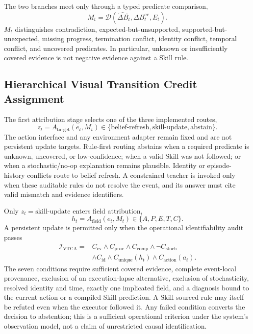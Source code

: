The two branches meet only through a typed predicate comparison,
\begin{equation}
    M_t=\mathcal{D}\left(\widehat{\Delta B}_t,
    \Delta B_t^{\mathrm{ev}},E_t\right).
\end{equation}
$M_t$ distinguishes contradiction, expected-but-unsupported, supported-but-unexpected, missing progress, termination conflict, identity conflict, temporal conflict, and uncovered predicates. In particular, unknown or insufficiently covered evidence is not negative evidence against a Skill rule.

\subsection{Hierarchical Visual Transition Credit Assignment}

The first attribution stage selects one of the three implemented routes,
{\color{red}
\begin{equation}
    z_t=A_{\mathrm{target}}(e_t,M_t)
    \in\{\mathrm{belief\mbox{-}refresh},
    \mathrm{skill\mbox{-}update},\mathrm{abstain}\}.
\end{equation}
The action interface and any environment adapter remain fixed and are not persistent update targets.}
Rule-first routing abstains when a required predicate is unknown, uncovered, or low-confidence; when a valid Skill was not followed; or when a stochastic/no-op explanation remains plausible. Identity or episode-history conflicts route to belief refresh.  A constrained teacher is invoked only when these auditable rules do not resolve the event, and its answer must cite valid mismatch and evidence identifiers.

Only $z_t=\mathrm{skill\mbox{-}update}$ enters field attribution,
\begin{equation}
    h_t=A_{\mathrm{field}}(e_t,M_t)
    \in\{A,P,E,T,C\}.
\end{equation}
{\color{red}A persistent update is permitted only when the operational identifiability audit passes
\begin{equation}
    \begin{aligned}
    \mathcal{I}_{\mathrm{VTCA}}={}&
    C_{\mathrm{ev}}\wedge C_{\mathrm{prov}}\wedge C_{\mathrm{comp}}
    \wedge\neg C_{\mathrm{stoch}}\\
    &\wedge C_{\mathrm{id}}\wedge C_{\mathrm{unique}}(h_t)
    \wedge C_{\mathrm{action}}(a_t).
    \end{aligned}
\end{equation}
The seven conditions require sufficient covered evidence, complete event-local provenance, exclusion of an execution-lapse alternative, exclusion of stochasticity, resolved identity and time, exactly one implicated field, and a diagnosis bound to the current action or a compiled Skill prediction. A Skill-sourced rule may itself be refuted even when the executor followed it. Any failed condition converts the decision to abstention; this is a sufficient operational criterion under the system's observation model, not a claim of unrestricted causal identification.}


